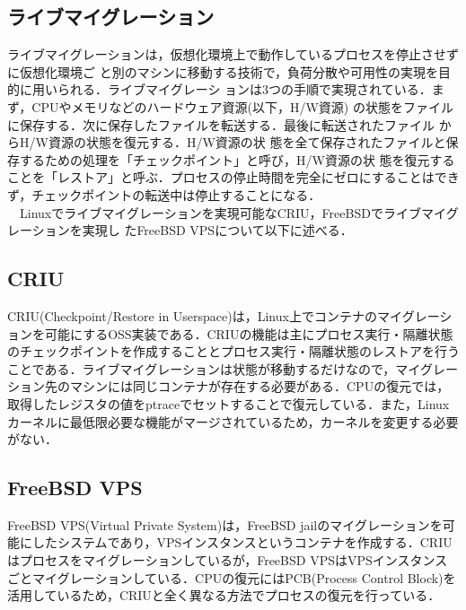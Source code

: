 \documentclass[11pt]{jarticle}
\begin{document}
\subsection{ライブマイグレーション}

ライブマイグレーションは，仮想化環境上で動作しているプロセスを停止させずに仮想化環境ご
と別のマシンに移動する技術で，負荷分散や可用性の実現を目的に用いられる．ライブマイグレーシ
ョンは3つの手順で実現されている．まず，CPUやメモリなどのハードウェア資源(以下，H/W資源)
の状態をファイルに保存する．次に保存したファイルを転送する．最後に転送されたファイル
からH/W資源の状態を復元する．H/W資源の状
態を全て保存されたファイルと保存するための処理を「チェックポイント」と呼び，H/W資源の状
態を復元することを「レストア」と呼ぶ．プロセスの停止時間を完全にゼロにすることはできず，チェックポイントの転送中は停止することになる．\\
　Linuxでライブマイグレーションを実現可能なCRIU，FreeBSDでライブマイグレーションを実現し
たFreeBSD VPSについて以下に述べる．

\subsection{CRIU}
\label{sec:CRIU}
CRIU(Checkpoint/Restore in Userspace)は，Linux上でコンテナのマイグレーションを可能にするOSS実装である．CRIUの機能は主にプロセス実行・隔離状態のチェックポイントを作成することとプロセス実行・隔離状態のレストアを行うことである．ライブマイグレーションは状態が移動するだけなので，マイグレーション先のマシンには同じコンテナが存在する必要がある．CPUの復元では，取得したレジスタの値をptraceでセットすることで復元している．また，Linuxカーネルに最低限必要な機能がマージされているため，カーネルを変更する必要がない．

\subsection{FreeBSD VPS}
\label{sec:FreeBSD VPS}
FreeBSD VPS(Virtual Private System)は，FreeBSD jailのマイグレーションを可能にしたシステムであり，VPSインスタンスというコンテナを作成する．CRIUはプロセスをマイグレーションしているが，FreeBSD VPSはVPSインスタンスごとマイグレーションしている．CPUの復元にはPCB(Process Control Block)を活用しているため，CRIUと全く異なる方法でプロセスの復元を行っている．
\end{document}
